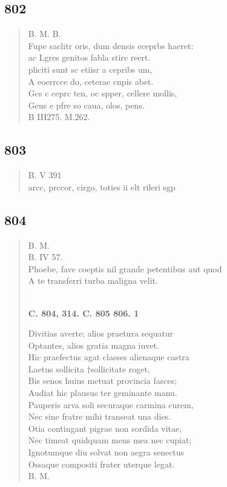 \documentclass[11pt, a4paper]{report}
\begin{document}
            \subsection*{802}
      \begin{verse}
      B. M. B. \\ Fupe saclitr oris, dum densis eceprbs haeret: \\ ac Lgres genitos fabla stire reert. \\ pliciti sunt sc etiisr a cepribs um, \\ A eoerrcce do, ceterac cnpis abet. \\ Gcs c ceprc ten, oc spper, cellere mollis, \\ Gens e pfre so caua, olos, pens. \\ B III275. M.262. \\ 
      \end{verse}
  
            \subsection*{803}
      \begin{verse}
      B. V 391 \\ arcc, prccor, cirgo, toties ii elt rileri sgp \\ 
      \end{verse}
  
            \subsection*{804}
      \begin{verse}
      B. M. \\ B. IV 57. \\ Phoebe, fave coeptis nil grande petentibus aut quod \\ A te transferri turba maligna velit. \\ 
        ﻿\pagebreak 
    \begin{center} \textbf{C. 804, 314. C. 805 806. 1} \end{center} \marginpar{[278]} Divitias averte; alios praetura sequatur \\ Optantes, alios gratia magna iuvet. \\ Hic praefectus agat classes alienaque castra \\ Laetus sollicita †sollicitate roget, \\ Bis senos huius metuat provincia fasces; \\ Audiat hic plausus ter geminante manu. \\ Pauperis arva soli securaque \rbrack  carmina curem, \\ Nec sine fratre mihi transeat una dies. \\ Otia contingant pigrae non sordida vitae, \\ Nec timeat quidquam mens mea nec cupiat; \\ Ignotumque diu solvat non aegra senectus \\ Ossaque compositi frater uterque legat. \\ B. M. \\ 
      \end{verse}
  
\end{document}
